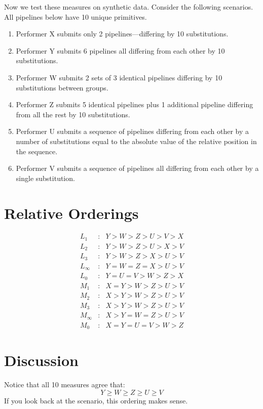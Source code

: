 \documentclass{article}
\begin{document}
Now we test these measures on synthetic data.  Consider the following
scenarios.  All pipelines below have 10 unique primitives.
\begin{enumerate}
\item 
  Performer X submits only 2 pipelines---differing by 10 substitutions.
\item
  Performer Y submits 6 pipelines all differing from each other by 10
  substitutions.
\item
  Performer W submits 2 sets of 3 identical pipelines differing by 10
  substitutions between groups.
\item
  Performer Z submits 5 identical pipelines plus 1 additional pipeline
  differing from all the rest by 10 substitutions.
\item
  Performer U submits a sequence of pipelines differing from each
  other by a number of substitutions equal to the absolute value of the
  relative position in the sequence.
\item
  Performer V submits a sequence of pipelines all differing from each
  other by a single substitution.
\end{enumerate}

\section{Relative Orderings}

\begin{eqnarray}
  L_1 & : & Y > W > Z > U > V > X \\
  L_2 & : & Y > W > Z > U > X > V \\
  L_3 & : & Y > W > Z > X > U > V \\
  L_\infty & : & Y = W = Z = X > U > V \\
  L_0 & : & Y = U = V > W > Z > X \\
  M_1 & : & X = Y > W > Z > U > V \\
  M_2 & : & X > Y > W > Z > U > V \\
  M_3 & : & X > Y > W > Z > U > V \\
  M_\infty & : & X > Y = W = Z > U > V \\
  M_0 & : & X = Y = U = V > W > Z 
\end{eqnarray}

\section{Discussion}
Notice that all 10 measures agree that:
$$Y \geq W \geq Z \geq U \geq V$$
If you look back at the scenario, this ordering makes sense.
\end{document}

